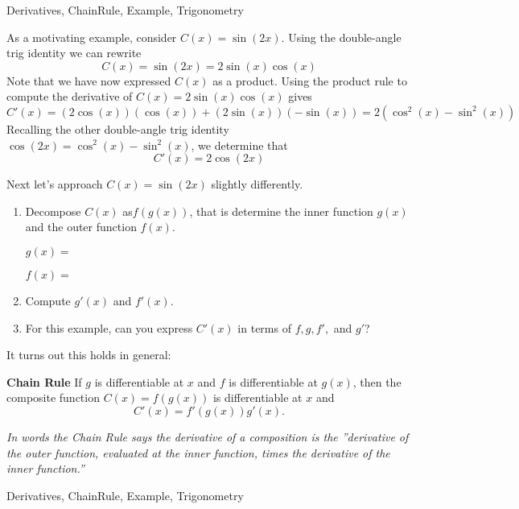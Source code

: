\begin{tagblock}{Derivatives, ChainRule, Example, Trigonometry}
\begin{question}
	






As a motivating example, consider $C(x) = \sin(2x)$.  Using the double-angle trig identity we can rewrite 
\[C(x) = \sin(2x) = 2\sin(x)\cos(x) \]
Note that we have now expressed $C(x)$ as a product. Using the product rule to compute the derivative of $C(x) = 2\sin(x) \cos(x)$ gives
\[C'(x) = (2\cos(x))(\cos(x)) + (2\sin(x))(-\sin(x)) = 2(\cos^2(x) - \sin^2(x))\]
Recalling the other double-angle trig identity $\cos(2x) = \cos^2(x) - \sin^2(x) $, we determine that 
\[C'(x) = 2\cos(2x)\]

Next let's approach $C(x) = \sin(2x)$ slightly differently.

\begin{enumerate}
\item  Decompose $C(x)$ as$f(g(x))$, that is determine the inner function $g(x)$ and the outer function $f(x)$.

\bigskip

$g(x) = $

\bigskip
$f(x) = $

\bigskip

\item Compute $g'(x)$ and $f'(x)$.

\vspace{.75in}

\item For this example, can you express $C'(x)$ in terms of $f, g, f',$ and $g'$?

\end{enumerate}
\newpage
It turns out this holds in general:

\textbf{Chain Rule}  If $g$ is differentiable at $x$ and $f$ is differentiable at $g(x)$, then the composite function $C(x)=f(g(x))$ is differentiable at $x$ and
\[C'(x)=f'(g(x))g'(x).\]

\emph{In words the Chain Rule says the derivative of a composition is the ''derivative of the outer function, evaluated at the inner function, times the derivative of the inner function.'' }


	
\begin{tags}
	    Derivatives, ChainRule, Example, Trigonometry
\end{tags}
	
\begin{diary}
\end{diary}
	
\begin{solution}
	   
\end{solution}
	
\end{question}

\end{tagblock}

